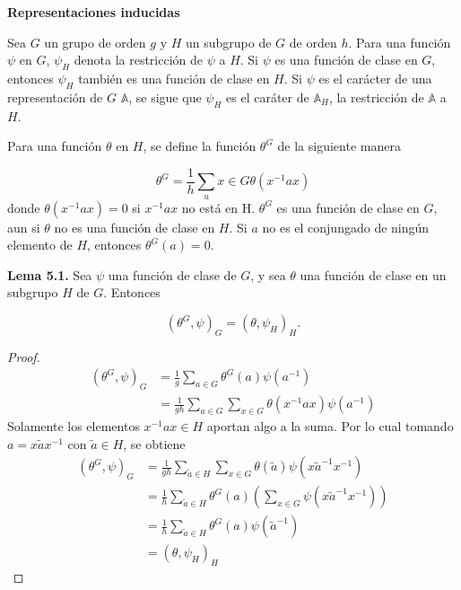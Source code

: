 \documentclass[12pt]{book}
\theoremstyle{definition}
\newcounter{in}
\begin{document}
\textbf{Representaciones inducidas} 

Sea $G$ un grupo de orden $g$ y $H$ un subgrupo de $G$ de orden
$h$. Para una función $\psi$ en $G$, $\psi_{H}$ denota la restricción
de $\psi$ a $H$. Si $\psi$ es una función de clase en $G$, entonces
$\psi_{H}$ también es una función de clase en $H$. Si $\psi$ es el
carácter de una representación de $G$ $\mathbb{A}$, se sigue que
$\psi_{H}$ es el caráter de $\mathbb{A}_{H}$, la restricción de
$\mathbb{A}$ a $H$.

Para una función $\theta$ en $H$, se define la función $\theta^{G}$ de
la siguiente manera

\begin{equation*}
  \theta^{G}=\frac{1}{h} \sum_ u{x \in G} \theta(x^{-1}ax)
\end{equation*}
donde $\theta(x^{-1}ax)=0$ si $x^{-1}ax$ no está en H. $\theta^{G}$ es
una función de clase en $G$, aun si $\theta$ no es una función de
clase en $H$. Si $a$ no es el conjungado de ningún elemento de $H$,
entonces $\theta^{G}(a)=0$.

\textbf{Lema 5.1. } Sea $\psi$ una función de clase de $G$, y sea
$\theta$ una función de clase en un subgrupo $H$ de $G$. Entonces

\begin{equation*}
  (\theta^{G},\psi)_{G}= (\theta,\psi_{H})_{H} .
\end{equation*}

\begin{proof}
  \begin{equation*}
    \begin{aligned}
      (\theta^{G},\psi)_{G} &= \frac{1}{g} \sum_{a \in G} \theta^{G}(a) \psi(a^{-1})\\
      &= \frac{1}{gh} \sum_{a \in G} \sum_{x \in G} \theta(x^{-1}ax) \psi(a^{-1})
    \end{aligned}
  \end{equation*}  
  Solamente los elementos $x^{-1}ax \in H$ aportan algo a la suma. Por
  lo cual tomando $a=x \tilde{a} x^{-1}$ con $\tilde{a} \in H$, se
  obtiene
  \begin{equation*}
    \begin{aligned}
      (\theta^{G},\psi)_{G} &= \frac{1}{gh} \sum_{\tilde{a} \in H} \sum_{x \in G} \theta(\tilde{a}) \psi(x \tilde{a}^{-1} x^{-1})\\
      &= \frac{1}{h} \sum_{\tilde{a} \in H} \theta^{G}(a) (\sum_{x \in G} \psi(x \tilde{a}^{-1}x^{-1})) \\
      &= \frac{1}{h} \sum_{\tilde{a} \in H} \theta^{G}(a) \psi(\tilde{a}^{-1}) \\
      &=  (\theta,\psi_{H})_{H}
    \end{aligned}
  \end{equation*}
\end{proof}
\end{document}
